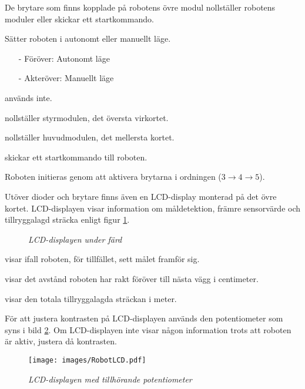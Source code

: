 \documentclass[11pt]{article}
\begin{document}
De brytare som finns kopplade på robotens övre modul nollställer robotens moduler eller skickar ett startkommando. 
\begin{description}[style=unboxed, leftmargin=0cm]
  \item[Brytare 1] Sätter roboten i autonomt eller manuellt läge. 
    \begin{itemize}
      \setlength\itemsep{-0.5em}
      \item[-] Föröver: Autonomt läge
      \item[-] Akteröver: Manuellt läge
    \end{itemize}
  \item[Brytare 2] används inte.
  \item[Brytare 3] nollställer styrmodulen, det översta virkortet.
  \item[Brytare 4] nollställer huvudmodulen, det mellersta kortet.
  \item[Brytare 5] skickar ett startkommando till roboten.
\end{description}

Roboten initieras genom att aktivera brytarna i ordningen ($3 \rightarrow 4 \rightarrow 5$).

Utöver dioder och brytare finns även en LCD-display monterad på det övre kortet. LCD-displayen visar information om måldetektion, främre sensorvärde och tillryggalagd sträcka enligt figur \ref{lcd}.

\begin{figure}[htbp]
	\centering
	
	\caption{\textit{LCD-displayen under färd} \label{lcd}}
\end{figure}

\begin{description}[style=unboxed, leftmargin=0cm]

  \item[Target] visar ifall roboten, för tillfället, sett målet framför sig.

  \item[Forw] visar det avstånd roboten har rakt föröver till nästa vägg i centimeter.
  \item[Trip] visar den totala tillryggalagda sträckan i meter.
\end{description}

För att justera kontrasten på LCD-displayen används den potentiometer som syns i bild \ref{lcdPot}. Om LCD-displayen inte visar någon information trots att roboten är aktiv, justera då kontrasten.


\begin{figure}[htbp]
	\centering
	\texttt{[image: images/RobotLCD.pdf]}
	\caption{\textit{LCD-displayen med tillhörande potentiometer} \label{lcdPot}}
\end{figure}
\end{document}
